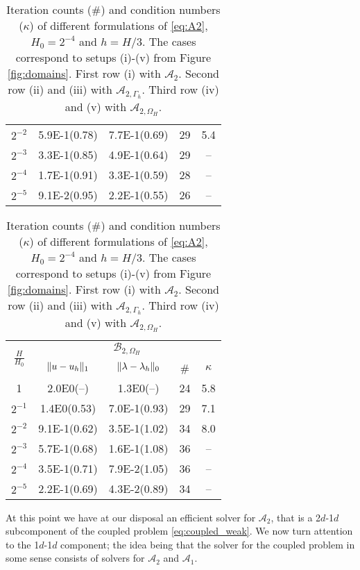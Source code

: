 \begin{table}
{\begin{minipage}{0.49\textwidth}
\begin{center}
\begin{tabular}{c|cccc}
$2^{-2}$ & 5.9E-1(0.78) & 7.7E-1(0.69) & 29 &5.4\\
$2^{-3}$ & 3.3E-1(0.85) & 4.9E-1(0.64) & 29 &-- \\
$2^{-4}$ & 1.7E-1(0.91) & 3.3E-1(0.59) & 28 &-- \\
$2^{-5}$ & 9.1E-2(0.95) & 2.2E-1(0.55) & 26 &-- \\
      \hline
  \end{tabular}
  \end{center}
  \end{minipage}
  }
  \scriptsize{%
    \begin{minipage}{0.49\textwidth}
  \begin{center}
    \begin{tabular}{c|cccc}
      \hline
      \multirow{2}{*}{$\frac{H}{H_0}$} & \multicolumn{4}{c}{$\mathcal{B}_{2, \Omega_H}$}\\
      \cline{2-5}
      & $\lVert{u-u_h}\rVert_1$ & $\lVert{\lambda-\lambda_h}\rVert_0$ & \# & $\kappa$\\
      \hline
1       & 2.0E0(--) & 1.3E0(--)        & 24 & 5.8\\
$2^{-1}$ & 1.4E0(0.53) & 7.0E-1(0.93)   & 29 & 7.1\\
$2^{-2}$ & 9.1E-1(0.62) & 3.5E-1(1.02)  & 34 & 8.0\\
$2^{-3}$ & 5.7E-1(0.68) & 1.6E-1(1.08)  & 36 & -- \\
$2^{-4}$ & 3.5E-1(0.71) & 7.9E-2(1.05)  & 36 & -- \\
$2^{-5}$ & 2.2E-1(0.69) & 4.3E-2(0.89)  & 34 & -- \\
      \hline
  \end{tabular}
  \end{center}
  \end{minipage}
  }
  \caption{Iteration counts (\#) and condition numbers ($\kappa$) of different
    formulations of \eqref{eq:A2}, $H_0=2^{-4}$ and $h=H/3$.
    The cases correspond to setups (i)-(v) from Figure \ref{fig:domains}.
    First row (i) with $\mathcal{A}_2$. Second row (ii) and (iii) with
    $\mathcal{A}_{2, \Gamma_h}$. Third row (iv) and (v) with $\mathcal{A}_{2, \Omega_H}$.
  }
  \label{tab:A2}
\end{table}

At this point we have at our disposal an efficient solver for $\mathcal{A}_2$,
that is a 2$d$-1$d$ subcomponent of the coupled problem \eqref{eq:coupled_weak}.
We now turn attention to the 1$d$-1$d$ component; the idea being that the solver
for the coupled problem in some sense consists of solvers for $\mathcal{A}_2$ and
$\mathcal{A}_1$.
